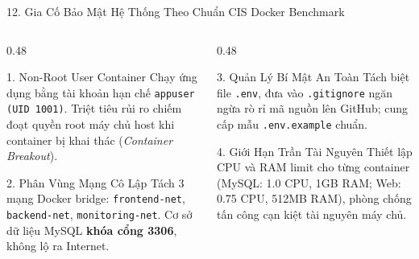 \documentclass[aspectratio=169,10pt]{beamer}
\begin{document}
\begin{frame}{12. Gia Cố Bảo Mật Hệ Thống Theo Chuẩn CIS Docker Benchmark}
    \begin{columns}[T]
        \begin{column}{0.48\textwidth}
            \begin{block}{1. Non-Root User Container}
                Chạy ứng dụng bằng tài khoản hạn chế \texttt{appuser (UID 1001)}. Triệt tiêu rủi ro chiếm đoạt quyền root máy chủ host khi container bị khai thác (\textit{Container Breakout}).
            \end{block}
            \begin{block}{2. Phân Vùng Mạng Cô Lập}
                Tách 3 mạng Docker bridge: \texttt{frontend-net}, \texttt{backend-net}, \texttt{monitoring-net}. Cơ sở dữ liệu MySQL \textbf{khóa cổng 3306}, không lộ ra Internet.
            \end{block}
        \end{column}

        \begin{column}{0.48\textwidth}
            \begin{exampleblock}{3. Quản Lý Bí Mật An Toàn}
                Tách biệt file \texttt{.env}, đưa vào \texttt{.gitignore} ngăn ngừa rò rỉ mã nguồn lên GitHub; cung cấp mẫu \texttt{.env.example} chuẩn.
            \end{exampleblock}
            \begin{exampleblock}{4. Giới Hạn Trần Tài Nguyên}
                Thiết lập CPU và RAM limit cho từng container (MySQL: 1.0 CPU, 1GB RAM; Web: 0.75 CPU, 512MB RAM), phòng chống tấn công cạn kiệt tài nguyên máy chủ.
            \end{exampleblock}
        \end{column}
    \end{columns}
\end{frame}
\end{document}
